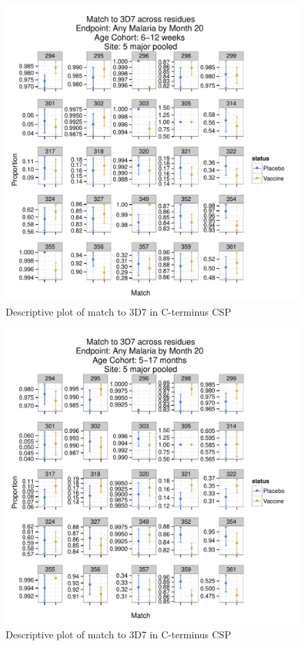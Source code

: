 \documentclass[]{article}
\begin{document}
\begin{figure}[htbp]
\centering
\includegraphics{figures/residue-specific-match-newborn-x-1.pdf}
\caption{Descriptive plot of match to 3D7 in C-terminus CSP}
\end{figure}

\begin{figure}[htbp]
\centering
\includegraphics{figures/residue-specific-match-infant-x-1.pdf}
\caption{Descriptive plot of match to 3D7 in C-terminus CSP}
\end{figure}
\end{document}
